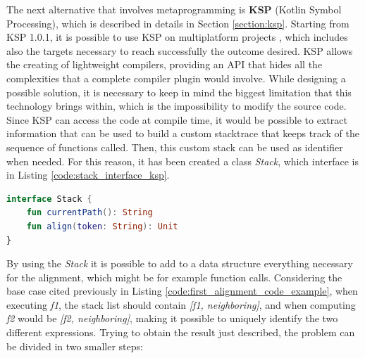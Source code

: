 The next alternative that involves metaprogramming is \textbf{KSP} (Kotlin Symbol Processing), which is described in details in Section \ref{section:ksp}. Starting from KSP 1.0.1, it is possible to use KSP on multiplatform projects \cite{ksp_multiplatform}, which includes also the targets necessary to reach successfully the outcome desired.\newline
KSP allows the creating of lightweight compilers, providing an API that hides all the complexities that a complete compiler plugin would involve. While designing a possible solution, it is necessary to keep in mind the biggest limitation that this technology brings within, which is the impossibility to modify the source code.\newline
Since KSP can access the code at compile time, it would be possible to extract information that can be used to build a custom stacktrace that keeps track of the sequence of functions called. Then, this custom stack can be used as identifier when needed. For this reason, it has been created a class \textit{Stack}, which interface is in Listing \ref{code:stack_interface_ksp}.
\begin{lstlisting}[caption={Stack interface for KSP}, captionpos=b, language=Kotlin, label={code:stack_interface_ksp}]
interface Stack {
    fun currentPath(): String
    fun align(token: String): Unit
}
\end{lstlisting}
By using the \textit{Stack} it is possible to add to a data structure everything necessary for the alignment, which might be for example function calls. Considering the base case cited previously in Listing \ref{code:first_alignment_code_example}, when executing \textit{f1}, the stack list should contain \textit{[f1, neighboring]}, and when computing \textit{f2} would be \textit{[f2, neighboring]}, making it possible to uniquely identify the two different expressions.\newline
Trying to obtain the result just described, the problem can be divided in two smaller steps:
